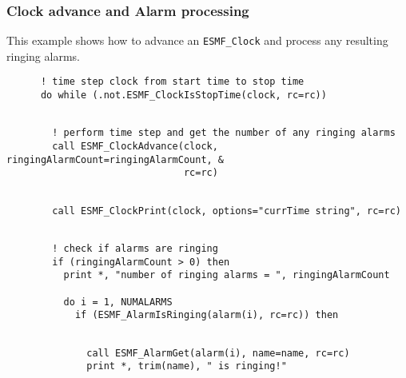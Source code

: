 
  \subsubsection{Clock advance and Alarm processing}
 
   This example shows how to advance an {\tt ESMF\_Clock} and process any 
   resulting ringing alarms. 

 \begin{verbatim}
      ! time step clock from start time to stop time
      do while (.not.ESMF_ClockIsStopTime(clock, rc=rc))
 
\end{verbatim}
 

 \begin{verbatim}
        ! perform time step and get the number of any ringing alarms
        call ESMF_ClockAdvance(clock, ringingAlarmCount=ringingAlarmCount, &
                               rc=rc)
 
\end{verbatim}
 

 \begin{verbatim}
        call ESMF_ClockPrint(clock, options="currTime string", rc=rc)
 
\end{verbatim}
 

 \begin{verbatim}
        ! check if alarms are ringing
        if (ringingAlarmCount > 0) then
          print *, "number of ringing alarms = ", ringingAlarmCount

          do i = 1, NUMALARMS
            if (ESMF_AlarmIsRinging(alarm(i), rc=rc)) then
 
\end{verbatim}
 

 \begin{verbatim}
              call ESMF_AlarmGet(alarm(i), name=name, rc=rc)
              print *, trim(name), " is ringing!"
 
\end{verbatim}
 
